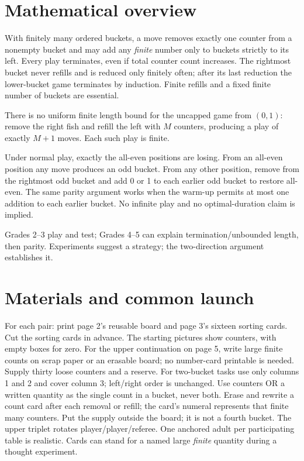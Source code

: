\documentclass[11pt,letterpaper]{article}
\begin{document}
\section*{Mathematical overview}
With finitely many ordered buckets, a move removes exactly one counter from a nonempty bucket and may add any \emph{finite} number only to buckets strictly to its left. Every play terminates, even if total counter count increases. The rightmost bucket never refills and is reduced only finitely often; after its last reduction the lower-bucket game terminates by induction. Finite refills and a fixed finite number of buckets are essential.

There is no uniform finite length bound for the uncapped game from $(0,1)$: remove the right fish and refill the left with $M$ counters, producing a play of exactly $M+1$ moves. Each such play is finite.

Under normal play, exactly the all-even positions are losing. From an all-even position any move produces an odd bucket. From any other position, remove from the rightmost odd bucket and add 0 or 1 to each earlier odd bucket to restore all-even. The same parity argument works when the warm-up permits at most one addition to each earlier bucket. No infinite play and no optimal-duration claim is implied.

Grades 2--3 play and test; Grades 4--5 can explain termination/unbounded length, then parity. Experiments suggest a strategy; the two-direction argument establishes it.
\newpage
\section*{Materials and common launch}
For each pair: print page 2's reusable board and page 3's sixteen sorting cards. Cut the sorting cards in advance. The starting pictures show counters, with empty boxes for zero. For the upper continuation on page 5, write large finite counts on scrap paper or an erasable board; no number-card printable is needed. Supply thirty loose counters and a reserve. For two-bucket tasks use only columns 1 and 2 and cover column 3; left/right order is unchanged. Use counters OR a written quantity as the single count in a bucket, never both. Erase and rewrite a count card after each removal or refill; the card's numeral represents that finite many counters. Put the supply outside the board; it is not a fourth bucket. The upper triplet rotates player/player/referee. One anchored adult per participating table is realistic. Cards can stand for a named large \emph{finite} quantity during a thought experiment.
\end{document}
